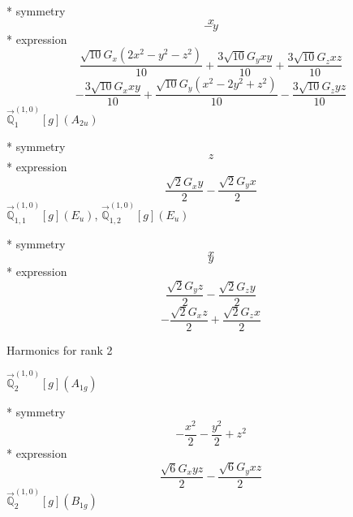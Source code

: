 \documentclass[fleqn,8pt]{jsarticle}
\begin{document}
\noindent\quad ** symmetry
\begin{dmath*}
x
\end{dmath*}
\begin{dmath*}
- y
\end{dmath*}
\noindent\quad ** expression
\begin{dmath*}
\frac{\sqrt{10} G_{x} \left(2 x^{2} - y^{2} - z^{2}\right)}{10} + \frac{3 \sqrt{10} G_{y} x y}{10} + \frac{3 \sqrt{10} G_{z} x z}{10}
\end{dmath*}
\begin{dmath*}
- \frac{3 \sqrt{10} G_{x} x y}{10} + \frac{\sqrt{10} G_{y} \left(x^{2} - 2 y^{2} + z^{2}\right)}{10} - \frac{3 \sqrt{10} G_{z} y z}{10}
\end{dmath*}
\noindent\quad $\vec{\mathbb{Q}}_{1}^{(1,0)}[g](A_{2u})$

\noindent\quad ** symmetry
\begin{dmath*}
z
\end{dmath*}
\noindent\quad ** expression
\begin{dmath*}
\frac{\sqrt{2} G_{x} y}{2} - \frac{\sqrt{2} G_{y} x}{2}
\end{dmath*}
\noindent\quad $\vec{\mathbb{Q}}_{1,1}^{(1,0)}[g](E_{u})$, $\vec{\mathbb{Q}}_{1,2}^{(1,0)}[g](E_{u})$

\noindent\quad ** symmetry
\begin{dmath*}
x
\end{dmath*}
\begin{dmath*}
y
\end{dmath*}
\noindent\quad ** expression
\begin{dmath*}
\frac{\sqrt{2} G_{y} z}{2} - \frac{\sqrt{2} G_{z} y}{2}
\end{dmath*}
\begin{dmath*}
- \frac{\sqrt{2} G_{x} z}{2} + \frac{\sqrt{2} G_{z} x}{2}
\end{dmath*}

\noindent * Harmonics for rank 2

\noindent\quad $\vec{\mathbb{Q}}_{2}^{(1,0)}[g](A_{1g})$

\noindent\quad ** symmetry
\begin{dmath*}
- \frac{x^{2}}{2} - \frac{y^{2}}{2} + z^{2}
\end{dmath*}
\noindent\quad ** expression
\begin{dmath*}
\frac{\sqrt{6} G_{x} y z}{2} - \frac{\sqrt{6} G_{y} x z}{2}
\end{dmath*}
\noindent\quad $\vec{\mathbb{Q}}_{2}^{(1,0)}[g](B_{1g})$
\end{document}
